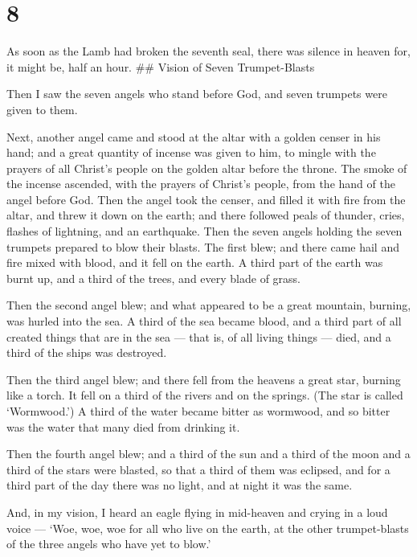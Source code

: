 \hypertarget{section-7}{%
\section{8}\label{section-7}}

 As soon as the Lamb had broken the seventh seal, there was
silence in heaven for, it might be, half an hour. \#\# Vision of Seven
Trumpet-Blasts

 Then I saw the seven angels who stand before God, and seven
trumpets were given to them.

 Next, another angel came and stood at the altar with a
golden censer in his hand; and a great quantity of incense was given to
him, to mingle with the prayers of all Christ's people on the golden
altar before the throne.  The smoke of the incense ascended,
with the prayers of Christ's people, from the hand of the angel before
God.  Then the angel took the censer, and filled it with
fire from the altar, and threw it down on the earth; and there followed
peals of thunder, cries, flashes of lightning, and an earthquake.
 Then the seven angels holding the seven trumpets prepared
to blow their blasts.  The first blew; and there came hail
and fire mixed with blood, and it fell on the earth. A third part of the
earth was burnt up, and a third of the trees, and every blade of grass.

 Then the second angel blew; and what appeared to be a great
mountain, burning, was hurled into the sea. A third of the sea became
blood,  and a third part of all created things that are in
the sea --- that is, of all living things --- died, and a third of the
ships was destroyed.

 Then the third angel blew; and there fell from the heavens
a great star, burning like a torch. It fell on a third of the rivers and
on the springs.  (The star is called `Wormwood.') A third
of the water became bitter as wormwood, and so bitter was the water that
many died from drinking it.

 Then the fourth angel blew; and a third of the sun and a
third of the moon and a third of the stars were blasted, so that a third
of them was eclipsed, and for a third part of the day there was no
light, and at night it was the same.

 And, in my vision, I heard an eagle flying in mid-heaven
and crying in a loud voice --- `Woe, woe, woe for all who live on the
earth, at the other trumpet-blasts of the three angels who have yet to
blow.'

